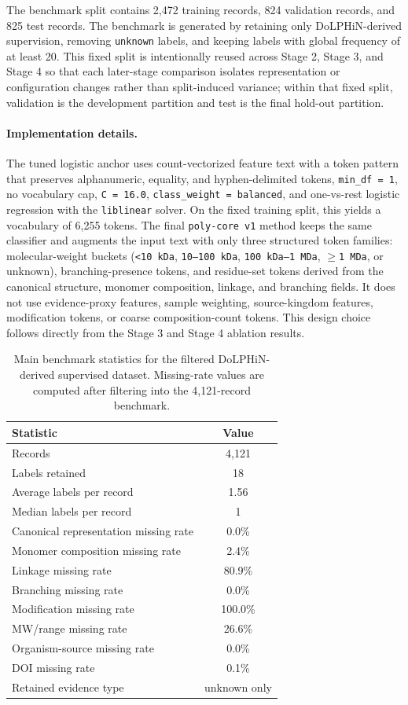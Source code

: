 \documentclass{article}
\begin{document}
The benchmark split contains 2,472 training records, 824 validation records, and 825 test records. The benchmark is generated by retaining only DoLPHiN-derived supervision, removing \texttt{unknown} labels, and keeping labels with global frequency of at least 20. This fixed split is intentionally reused across Stage 2, Stage 3, and Stage 4 so that each later-stage comparison isolates representation or configuration changes rather than split-induced variance; within that fixed split, validation is the development partition and test is the final hold-out partition.

\paragraph{Implementation details.}
The tuned logistic anchor uses count-vectorized feature text with a token pattern that preserves alphanumeric, equality, and hyphen-delimited tokens, \texttt{min\_df = 1}, no vocabulary cap, \texttt{C = 16.0}, \texttt{class\_weight = balanced}, and one-vs-rest logistic regression with the \texttt{liblinear} solver. On the fixed training split, this yields a vocabulary of 6,255 tokens. The final \texttt{poly-core v1} method keeps the same classifier and augments the input text with only three structured token families: molecular-weight buckets (\texttt{<10 kDa}, \texttt{10--100 kDa}, \texttt{100 kDa--1 MDa}, \texttt{$\geq$1 MDa}, or unknown), branching-presence tokens, and residue-set tokens derived from the canonical structure, monomer composition, linkage, and branching fields. It does not use evidence-proxy features, sample weighting, source-kingdom features, modification tokens, or coarse composition-count tokens. This design choice follows directly from the Stage 3 and Stage 4 ablation results.

\begin{table}[t]
\centering
\caption{Main benchmark statistics for the filtered DoLPHiN-derived supervised dataset. Missing-rate values are computed after filtering into the 4,121-record benchmark.}
\label{tab:dataset_stats}
\begin{tabular}{lc}
\toprule
Statistic & Value \\
\midrule
Records & 4,121 \\
Labels retained & 18 \\
Average labels per record & 1.56 \\
Median labels per record & 1 \\
Canonical representation missing rate & 0.0\% \\
Monomer composition missing rate & 2.4\% \\
Linkage missing rate & 80.9\% \\
Branching missing rate & 0.0\% \\
Modification missing rate & 100.0\% \\
MW/range missing rate & 26.6\% \\
Organism-source missing rate & 0.0\% \\
DOI missing rate & 0.1\% \\
Retained evidence type & unknown only \\
\bottomrule
\end{tabular}
\end{table}
\end{document}
